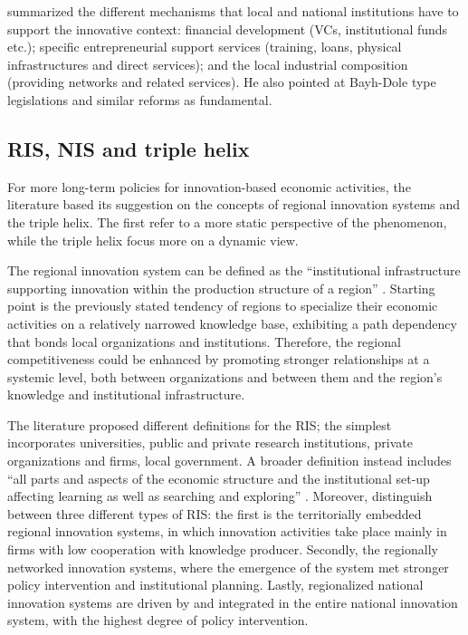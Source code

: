 \citet{Fini2009} summarized the different mechanisms that local and national institutions have to support the innovative context: financial development (VCs, institutional funds etc.); specific entrepreneurial support services (training, loans, physical infrastructures and direct services); and the local industrial composition (providing networks and related services). He also pointed at Bayh-Dole type legislations and similar reforms as fundamental. 

\subsection{RIS, NIS and triple helix}

For more long-term policies for innovation-based economic activities, the literature based its suggestion on the concepts of regional innovation systems and the triple helix. The first refer to a more static perspective of the phenomenon, while the triple helix focus more on a dynamic view.

The regional innovation system can be defined as the \enquote{institutional infrastructure supporting innovation within the production structure of a region} \citep{Asheim2009}. Starting point is the previously stated tendency of regions to specialize their economic activities on a relatively narrowed knowledge base, exhibiting a path dependency that bonds local organizations and institutions. Therefore, the regional competitiveness could be enhanced by promoting stronger relationships at a systemic level, both between organizations and between them and the region's knowledge and institutional infrastructure.

The literature proposed different definitions for the RIS; the simplest incorporates universities, public and private research institutions, private organizations and firms, local government. A broader definition instead includes \enquote{all parts and aspects of the economic structure and the institutional set-up affecting learning as well as searching and exploring} \citep{Etzkowitz2000}. Moreover, \citet{Asheim2009} distinguish between three different types of RIS: the first is the territorially embedded regional innovation systems, in which innovation activities take place mainly in firms with low cooperation with knowledge producer. Secondly, the regionally networked innovation systems, where the emergence of the system met stronger policy intervention and institutional planning. Lastly, regionalized national innovation systems are driven by and integrated in the entire national innovation system, with the highest degree of policy intervention.

